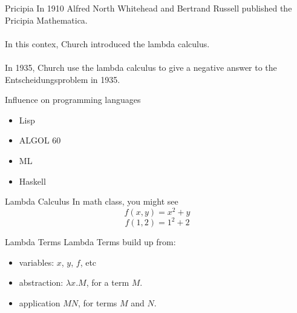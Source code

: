 \documentclass{beamer}
\newcommand{\vs}{\\~\\}
\begin{document}
\begin{frame}{Pricipia}
  In 1910 Alfred North Whitehead and Bertrand Russell published the Pricipia Mathematica.
  \vs
  In this contex, Church introduced the lambda calculus.
  \vs
  In 1935, Church use the lambda calculus to give a negative answer to the Entscheidungsproblem in 1935.
\end{frame}

\begin{frame}{Influence on programming languages}
  \begin{itemize}
    \item Lisp
    \item ALGOL 60
    \item ML
    \item Haskell
  \end{itemize}
\end{frame}

\begin{frame}{Lambda Calculus}
  In math class, you might see
  $$f(x, y) = x^2+y$$
  $$f(1, 2) = 1^2+2$$
\end{frame}

\begin{frame}{Lambda Terms}
  Lambda Terms build up from:
  \begin{itemize}
    \item variables: $x$, $y$, $f$, etc
    \item abstraction: $\lambda x. M$, for a term $M$.
    \item application $MN$, for terms $M$ and $N$.
  \end{itemize}
\end{frame}
\end{document}

